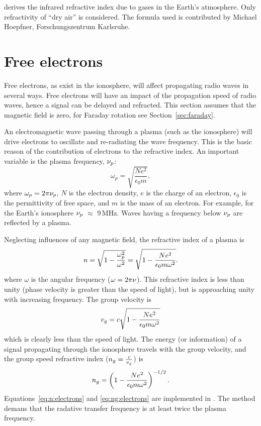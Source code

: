  derives the infrared refractive index due to gases in the Earth's atmosphere. Only refractivity of ``dry air'' is considered. The formula used is contributed by Michael Hoepfner, Forschungszentrum Karlsruhe.


\section{Free electrons}
 \label{sec:rindex:freee}
%
Free electrons, as exist in the ionosphere, will affect propagating radio waves
in several ways. Free electrons will have an impact of the propagation speed of
radio waves, hence a signal can be delayed and refracted. This section assumes
that the magnetic field is zero, for Faraday rotation see
Section~\ref{sec:faraday}.

An electromagnetic wave passing through a plasma (such as the ionosphere) will
drive electrons to oscillate and re-radiating the wave frequency. This is the
basic reason of the contribution of electrons to the refractive index. 
An important variable is the plasma frequency, $\nu_{p}$:
\begin{equation}
  \omega_{p}=\sqrt{\frac{Ne^{2}}{\epsilon_{0}m}},
\end{equation}
where \(\omega_{p}=2\pi\nu_{p}\), \(N\) is the electron density, \(e\) is the
charge of an electron, \(\epsilon_{0}\) is the permittivity of free space, and
\(m\) is the mass of an electron. For example, for the Earth's ionosphere
\(\nu_{p}\) \(\approx\) 9\,MHz.
Waves having a frequency below $\nu_{p}$ are reflected by a plasma.

Neglecting influences of any magnetic field, the refractive index of a plasma
is \citep[e.g.][]{rybicki:radia:79}
\begin{equation}
\label{eq:n:electrons}
n =\sqrt{1-\frac{\omega_{p}^{2}}{\omega^{2}}}=\sqrt{1-\frac{Ne^{2}}
{\epsilon_{0}m\omega^{2}}}.
\end{equation}
where $\omega$ is the angular frequency ($\omega=2\pi\nu$). This refractive
index is less than unity (phase velocity is greater than the speed of light),
but is approaching unity with increasing frequency. The group velocity is
\citep{rybicki:radia:79}
\begin{equation}
v_{g}=c\sqrt{1-\frac{Ne^{2}}
{\epsilon_{0}m\omega^{2}}}
\end{equation}
which is clearly less than the speed of light.
The energy (or information) of a signal propagating through the ionosphere
travels with the group velocity, and the group speed refractive
index (\(n_{g}=\frac{c}{v_{g}}\)) is
\begin{equation}
\label{eq:ng:electrons}
  n_{g}=\left(
    1-\frac{Ne^{2}}
    {\epsilon_{0}m\omega^{2}}
  \right)^{-1/2}.
\end{equation}
Equations~\ref{eq:n:electrons} and \ref{eq:ng:electrons} are implemented in
. The method demans that the radative
transfer frequency is at least twice the plasma frequency.


